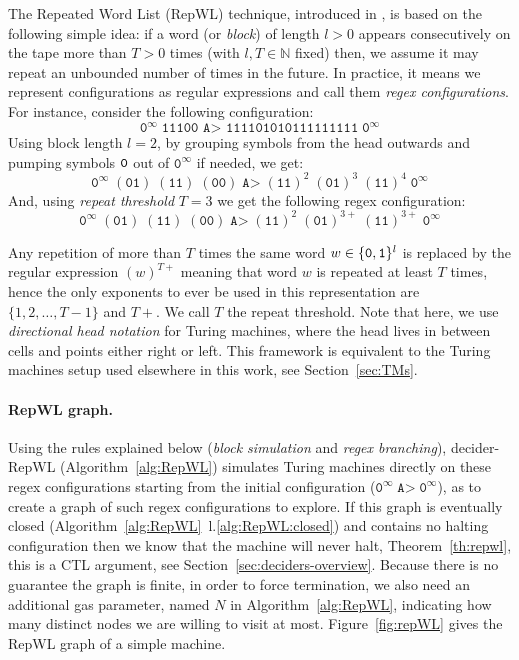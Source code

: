 The Repeated Word List (RepWL) technique, introduced in \CoqBB, is based on the following simple idea: if a word (or \textit{block}) of length $l > 0$ appears consecutively on the tape more than $T > 0$ times (with $l, T \in \mathbb{N}$ fixed) then, we assume it may repeat an unbounded number of times in the future. In practice, it means we represent configurations as regular expressions and call them \textit{regex configurations}. For instance, consider the following configuration:
$$ \texttt{0}^\infty \; \texttt{11100 A> 111101010111111111} \; \texttt{0}^\infty$$
Using block length $l=2$, by grouping symbols from the head outwards and pumping symbols $\texttt{0}$ out of $\texttt{0}^\infty$ if needed, we get:
$$ \texttt{0}^\infty \; (\texttt{01}) \; (\texttt{11}) \; (\texttt{00}) \; \texttt{A>} \; (\texttt{11})^2 \; (\texttt{01})^{3} \; (\texttt{11})^{4} \; \texttt{0}^\infty $$
And, using \textit{repeat threshold} $T=3$ we get the following regex configuration:
$$ \texttt{0}^\infty \; (\texttt{01}) \; (\texttt{11}) \; (\texttt{00}) \; \texttt{A>} \; (\texttt{11})^2 \; (\texttt{01})^{3+} \; (\texttt{11})^{3+} \; \texttt{0}^\infty $$

Any repetition of more than $T$ times the same word $w \in \{\texttt{0},\texttt{1}\}^l$ is replaced by the regular expression $(w)^{T+}$ meaning that word $w$ is repeated at least $T$ times, hence the only exponents to ever be used in this representation are $\{1,2,\dots,T-1\}$ and $T+$. We call $T$ the repeat threshold. Note that here, we use \textit{directional head notation} for Turing machines, where the head lives in between cells and points either right or left. This framework is equivalent to the Turing machines setup used elsewhere in this work, see Section~\ref{sec:TMs}.

\paragraph{RepWL graph.} Using the rules explained below (\textit{block simulation} and \textit{regex branching}), {\sc decider-RepWL} (Algorithm~\ref{alg:RepWL}) simulates Turing machines directly on these regex configurations starting from the initial configuration (\ie $\texttt{0}^\infty \; \texttt{A>} \; \texttt{0}^\infty$), as to create a graph of such regex configurations to explore. If this graph is eventually closed (Algorithm~\ref{alg:RepWL}~l.\ref{alg:RepWL:closed}) and contains no halting configuration then we know that the machine will never halt, Theorem~\ref{th:repwl}, this is a CTL argument, see Section~\ref{sec:deciders-overview}. Because there is no guarantee the graph is finite, in order to force termination, we also need an additional gas parameter, named $N$ in Algorithm~\ref{alg:RepWL}, indicating how many distinct nodes we are willing to visit at most. Figure~\ref{fig:repWL} gives the RepWL graph of a simple machine.

